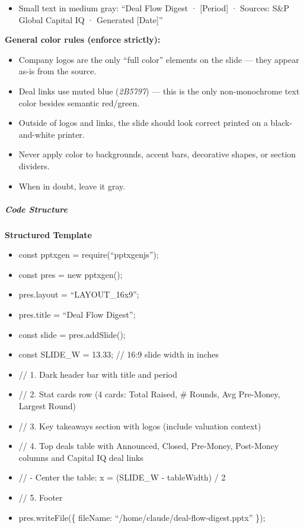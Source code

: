 \documentclass[11pt]{article}
\begin{document}
\begin{itemize}[leftmargin=*,itemsep=2pt,topsep=2pt]
\item {} Small text in medium gray: ``Deal Flow Digest · [Period] · Sources: S\&P Global Capital IQ · Generated [Date]''
\end{itemize}

\textbf{General color rules (enforce strictly):}

\begin{itemize}[leftmargin=*,itemsep=2pt,topsep=2pt]
\item {} Company logos are the only ``full color'' elements on the slide — they appear as-is from the source.
\item {} Deal links use muted blue (\emph{2B5797}) — this is the only non-monochrome text color besides semantic red/green.
\item {} Outside of logos and links, the slide should look correct printed on a black-and-white printer.
\item {} Never apply color to backgrounds, accent bars, decorative shapes, or section dividers.
\item {} When in doubt, leave it gray.
\end{itemize}

\subparagraph{Code Structure}\mbox{}\par

\textbf{Structured Template}
\begin{itemize}[leftmargin=*,itemsep=2pt,topsep=2pt]
\item {} const pptxgen = require(``pptxgenjs'');
\item {} const pres = new pptxgen();
\item {} pres.layout = ``LAYOUT\_\allowbreak{}16x9'';
\item {} pres.title = ``Deal Flow Digest'';
\item {} const slide = pres.addSlide();
\item {} const SLIDE\_\allowbreak{}W = 13.33; // 16:9 slide width in inches
\item {} // 1. Dark header bar with title and period
\item {} // 2. Stat cards row (4 cards: Total Raised, \# Rounds, Avg Pre-Money, Largest Round)
\item {} // 3. Key takeaways section with logos (include valuation context)
\item {} // 4. Top deals table with Announced, Closed, Pre-Money, Post-Money columns and Capital IQ deal links
\item {} // - Center the table: x = (SLIDE\_\allowbreak{}W - tableWidth) / 2
\item {} // 5. Footer
\item {} pres.writeFile(\{ fileName: ``/home/claude/deal-flow-digest.pptx'' \});
\end{itemize}
\end{document}
